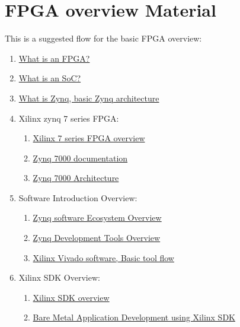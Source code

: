 \section{FPGA overview Material}
This is a suggested flow for the basic FPGA overview:

\begin{enumerate}
    \item \href{https://www.youtube.com/watch?v=CfmlsDW3Z4c}{What is an FPGA?}  
    \item \href{https://www.youtube.com/watch?v=RVM-ESUMOMU}{What is an SoC?} 
    \item \href{https://www.youtube.com/watch?v=-VE97r5XpEU}{What is Zynq, basic Zynq architecture} 
    \item Xilinx zynq 7 series FPGA: 
    \begin{enumerate}
        \item \href{https://www.youtube.com/watch?v=yCXIodRwWYU}{Xilinx 7 series FPGA overview} 
        \item \href{https://www.xilinx.com/products/silicon-devices/soc/zynq-7000.html#documentation}{Zynq 7000 documentation} 
        \item \href{https://www.youtube.com/watch?v=SIQD3_iQcU4}{Zynq 7000 Architecture} 
    \end{enumerate}
    \item Software Introduction Overview:
    \begin{enumerate}
        \item \href{https://www.youtube.com/watch?v=ClsRJ3KKf08&list=PLRr5m7hDN9TKiMF5fhq3EyoOjQVHyZkry&index=16}{Zynq software Ecosystem Overview}         
        \item \href{https://www.youtube.com/watch?v=K_nTqlimVlM&list=PLRr5m7hDN9TKiMF5fhq3EyoOjQVHyZkry&index=22}{Zynq Development Tools Overview}          
        \item \href{https://www.youtube.com/watch?v=Grs0gjeMPOY}{Xilinx Vivado software, Basic tool flow}  
    \end{enumerate}
    \item Xilinx SDK Overview:
    \begin{enumerate}
        \item \href{https://www.youtube.com/watch?v=K9NUiDW42BA&list=PLRr5m7hDN9TKiMF5fhq3EyoOjQVHyZkry&index=3}{Xilinx SDK overview}                                        
        \item \href{https://www.youtube.com/watch?v=hsvwCAH-uSw&list=PLRr5m7hDN9TKiMF5fhq3EyoOjQVHyZkry&index=12}{Bare Metal Application Development using Xilinx SDK}        

\end{enumerate}
\end{enumerate}
